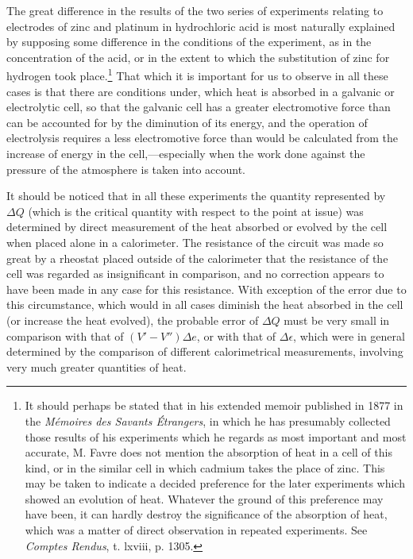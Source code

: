 \documentclass[12pt]{article}
\begin{document}
The great difference in the results of the two series of experiments relating to electrodes of zinc and platinum in hydrochloric acid is most naturally explained by supposing some difference in the conditions of the experiment, as in the concentration of the acid, or in the extent to which the substitution of zinc for hydrogen took place.\footnote{It should perhaps be stated that in his extended memoir published in 1877 in the \textit{M\'{e}moires des Savants \'{E}trangers}, in which he has presumably collected those results of his experiments which he regards as most important and most accurate, M. Favre does not mention the absorption of heat in a cell of this kind, or in the similar cell in which cadmium takes the place of zinc. This may be taken to indicate a decided preference for the later experiments which showed an evolution of heat. Whatever the ground of this preference may have been, it can hardly destroy the significance of the absorption of heat, which was a matter of direct observation in repeated experiments. See \textit{Comptes Rendus}, t. lxviii, p. 1305.} That which it is important for us to observe in all these cases is that there are conditions under, which heat is absorbed in a galvanic or electrolytic cell, so that the galvanic cell has a greater electromotive force than can be accounted for by the diminution of its energy, and the operation of electrolysis requires a less electromotive force than would be calculated from the increase of energy in the cell,---especially when the work done against the pressure of the atmosphere is taken into account.

It should be noticed that in all these experiments the quantity represented by $\Delta Q$ (which is the critical quantity with respect to the point at issue) was determined by direct measurement of the heat absorbed or evolved by the cell when placed alone in a calorimeter. The resistance of the circuit was made so great by a rheostat placed outside of the calorimeter that the resistance of the cell was regarded as insignificant in comparison, and no correction appears to have been made in any case for this resistance. With exception of the error due to this circumstance, which would in all cases diminish the heat absorbed in the cell (or increase the heat evolved), the probable error of $\Delta Q$ must be very small in comparison with that of $(V'- V'')\Delta e$, or with that of $\Delta \epsilon$, which were in general determined by the comparison of different calorimetrical measurements, involving very much greater quantities of heat.
\end{document}

